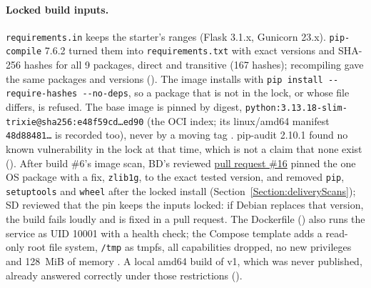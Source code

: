 \paragraph{Locked build inputs.} \texttt{requirements.in} keeps the starter's ranges (Flask 3.1.x, Gunicorn 23.x). \texttt{pip-compile} 7.6.2 turned them into \texttt{requirements.txt} with exact versions and SHA-256 hashes for all 9 packages, direct and transitive (167 hashes);
recompiling gave the same packages and versions (). The image installs with \texttt{pip install -{}-require-hashes -{}-no-deps}, so a package that is not in the lock, or whose file differs, is refused.
The base image is pinned by digest, \texttt{python:3.13.18-slim-trixie@sha256:e48f59cd\ldots ed90} (the OCI index; its linux/amd64 manifest \texttt{48d88481\ldots} is recorded too), never by a moving tag \cite{DockerBuildBestPractices}.
pip-audit 2.10.1 found no known vulnerability in the lock at that time, which is not a claim that none exist (). After build \#6's image scan, BD's reviewed \href{\GiteaRepoURL/pulls/16}{pull request \#16} pinned the one OS package with a fix, \texttt{zlib1g}, to the exact tested version,
and removed \texttt{pip}, \texttt{setuptools} and \texttt{wheel} after the locked install (Section~\ref{Section:deliveryScans}); SD reviewed that the pin keeps the inputs locked: if Debian replaces that version, the build fails loudly and is fixed in a pull request.
The Dockerfile () also runs the service as UID 10001 with a health check; the Compose template adds a read-only root file system, \texttt{/tmp} as tmpfs, all capabilities dropped, no new privileges and 128~MiB of memory
\cite{DockerEngineSecurity,FlaskDeploying}. A local amd64 build of v1, which was never published, already answered correctly under those restrictions ().

\begin{longlisting}
\inputminted[fontsize=\scriptsize]{python}{config/twintrack/pricing-service/app.py}
\caption{\texttt{pricing-service/app.py} on \texttt{main} (v2; v1 differs only in \texttt{VERSION = "v1"} and \texttt{UNIT\_PRICE = 10}).}
\label{Listing:EDeliveryApp}
\end{longlisting}

\begin{longlisting}
\inputminted[fontsize=\scriptsize]{python}{config/twintrack/pricing-service/test_app.py}
\caption{\texttt{pricing-service/test\_app.py} on \texttt{main} (v2 expectations: version v2, total 36).}
\label{Listing:EDeliveryTests}
\end{longlisting}

